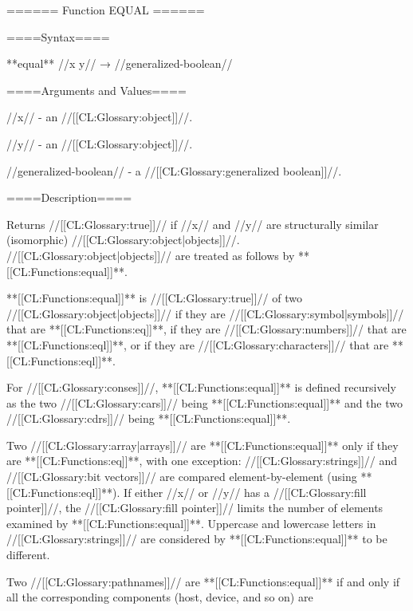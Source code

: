 ====== Function EQUAL ======

====Syntax====

**equal** //x y// → //generalized-boolean//

====Arguments and Values====

//x// - an //[[CL:Glossary:object]]//.

//y// - an //[[CL:Glossary:object]]//.

//generalized-boolean// - a //[[CL:Glossary:generalized boolean]]//.

====Description====

Returns //[[CL:Glossary:true]]// if //x// and //y// are structurally similar (isomorphic) //[[CL:Glossary:object|objects]]//. //[[CL:Glossary:object|objects]]// are treated as follows by **[[CL:Functions:equal]]**.

\beginlist {}

**[[CL:Functions:equal]]** is //[[CL:Glossary:true]]// of two //[[CL:Glossary:object|objects]]// if they are //[[CL:Glossary:symbol|symbols]]// that are **[[CL:Functions:eq]]**, if they are //[[CL:Glossary:numbers]]// that are **[[CL:Functions:eql]]**, or if they are //[[CL:Glossary:characters]]// that are **[[CL:Functions:eql]]**.


For //[[CL:Glossary:conses]]//, **[[CL:Functions:equal]]** is defined recursively as the two //[[CL:Glossary:cars]]// being **[[CL:Functions:equal]]** and the two //[[CL:Glossary:cdrs]]// being **[[CL:Functions:equal]]**.


Two //[[CL:Glossary:array|arrays]]// are **[[CL:Functions:equal]]** only if they are **[[CL:Functions:eq]]**, with one exception: //[[CL:Glossary:strings]]// and //[[CL:Glossary:bit vectors]]// are compared element-by-element (using **[[CL:Functions:eql]]**). If either //x// or //y// has a //[[CL:Glossary:fill pointer]]//, the //[[CL:Glossary:fill pointer]]// limits the number of elements examined by **[[CL:Functions:equal]]**. Uppercase and lowercase letters in //[[CL:Glossary:strings]]// are considered by **[[CL:Functions:equal]]** to be different.


Two //[[CL:Glossary:pathnames]]// are **[[CL:Functions:equal]]** if and only if all the corresponding components (host, device, and so on) are


